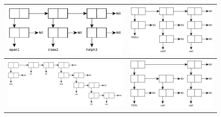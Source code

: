 \documentclass[a4paper]{report}
\begin{document}
\begin{figure}[!h]
\begin{tabular}{|l|l|}
		\includegraphics[scale=0.475]{inc/img/task0102.pdf} & \includegraphics[scale=0.475]{inc/img/task0105.pdf} \\\hline
		\includegraphics[scale=0.475]{inc/img/task0103.pdf} & \includegraphics[scale=0.475]{inc/img/task0106.pdf} \\\hline
	\end{tabular}
\end{figure}
\end{document}
